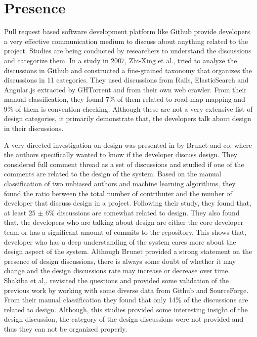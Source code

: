 \section{Presence}
\label{sect:presence}
Pull request based software development platform like Github provide developers a very effective communication medium to discuss about anything related to the project. Studies are being conducted by researchers to understand the discussions and categorize them. In a study in 2007, Zhi-Xing et al.,\cite{Li2007} tried to analyze the discussions in Github and constructed a fine-grained taxonomy that organizes the discussions in 11 categories. They used discussions from Rails, ElasticSearch and Angular.js extracted by GHTorrent and from their own web crawler. From their manual classification, they found 7\% of them related to road-map mapping and 9\% of them is convention checking. Although these are not a very extensive list of design categories, it primarily demonstrate that, the developers talk about design in their discussions.

A very directed investigation on design was presented in \cite{Brunet2014a} by Brunet and co. where the authors specifically wanted to know if the developer discuss design. They considered full comment thread as a set of discussions and studied if one of the comments are related to the design of the system. Based on the manual classification of two unbiased authors and machine learning algorithms, they found the ratio between the total number of contributer and the number of developer that discuss design in a project. Following their study, they found that, at least 25 {$\pm$} 6\% discussions are somewhat related to design. They also found that, the developers who are talking about design are either the core developer team or has a significant amount of commits to the repository. This shows that, developer who has a deep understanding of the system cares more about the design aspect of the system. Although Brunet \cite{Brunet2014a} provided a strong statement on the presence of design discussions, there is always some doubt of whether it may change and the design discussions rate may increase or decrease over time. Shakiba et al,.\cite{Shakiba2016} revisited the questions and provided some validation of the previous work by working with some diverse data from Github and SourceForge. From their manual classification they found that only 14\% of the discussions are related to design. Although, this studies provided some interesting insight of the design discussion, the category of the design discussions were not provided and thus they can not be organized properly.

